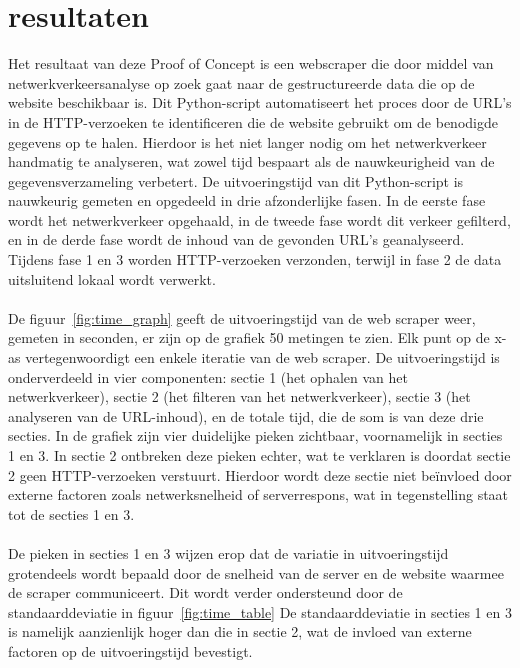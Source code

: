 \section{resultaten}
Het resultaat van deze Proof of Concept is een webscraper die door middel van netwerkverkeersanalyse op zoek gaat naar de gestructureerde data die op de website beschikbaar is. Dit Python-script automatiseert het proces door de URL's in de HTTP-verzoeken te identificeren die de website gebruikt om de benodigde gegevens op te halen. Hierdoor is het niet langer nodig om het netwerkverkeer handmatig te analyseren, wat zowel tijd bespaart als de nauwkeurigheid van de gegevensverzameling verbetert.
De uitvoeringstijd van dit Python-script is nauwkeurig gemeten en opgedeeld in drie afzonderlijke fasen. In de eerste fase wordt het netwerkverkeer opgehaald, in de tweede fase wordt dit verkeer gefilterd, en in de derde fase wordt de inhoud van de gevonden URL's geanalyseerd. Tijdens fase 1 en 3 worden HTTP-verzoeken verzonden, terwijl in fase 2 de data uitsluitend lokaal wordt verwerkt.
\\ \\
De figuur~\ref{fig:time_graph} geeft de uitvoeringstijd van de web scraper weer, gemeten in seconden, er zijn op de grafiek 50 metingen te zien. Elk punt op de x-as vertegenwoordigt een enkele iteratie van de web scraper. De uitvoeringstijd is onderverdeeld in vier componenten: sectie 1 (het ophalen van het netwerkverkeer), sectie 2 (het filteren van het netwerkverkeer), sectie 3 (het analyseren van de URL-inhoud), en de totale tijd, die de som is van deze drie secties.
In de grafiek zijn vier duidelijke pieken zichtbaar, voornamelijk in secties 1 en 3. In sectie 2 ontbreken deze pieken echter, wat te verklaren is doordat sectie 2 geen HTTP-verzoeken verstuurt. Hierdoor wordt deze sectie niet beïnvloed door externe factoren zoals netwerksnelheid of serverrespons, wat in tegenstelling staat tot de secties 1 en 3.
\\ \\
De pieken in secties 1 en 3 wijzen erop dat de variatie in uitvoeringstijd grotendeels wordt bepaald door de snelheid van de server en de website waarmee de scraper communiceert. Dit wordt verder ondersteund door de standaarddeviatie in figuur~\ref{fig:time_table} De standaarddeviatie in secties 1 en 3 is namelijk aanzienlijk hoger dan die in sectie 2, wat de invloed van externe factoren op de uitvoeringstijd bevestigt.
